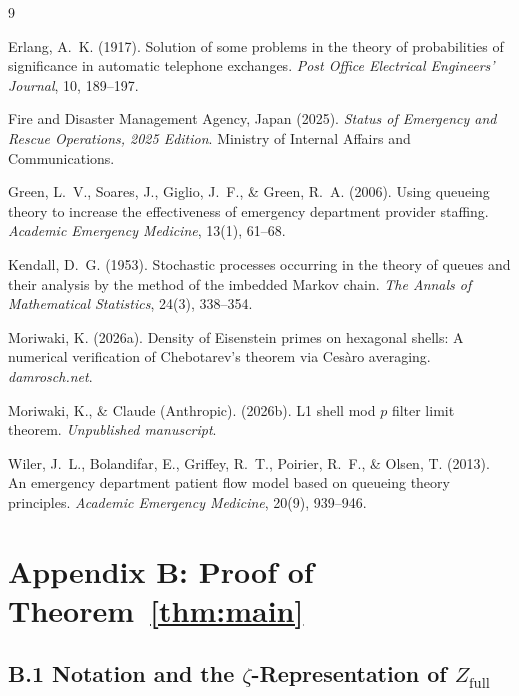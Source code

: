 \documentclass[12pt]{article}
\begin{document}

\begin{thebibliography}{9}

Erlang, A.~K. (1917).
Solution of some problems in the theory of probabilities of significance 
in automatic telephone exchanges.
\emph{Post Office Electrical Engineers' Journal}, 10, 189--197.

Fire and Disaster Management Agency, Japan (2025).
\emph{Status of Emergency and Rescue Operations, 2025 Edition}.
Ministry of Internal Affairs and Communications.

Green, L.~V., Soares, J., Giglio, J.~F., \& Green, R.~A. (2006).
Using queueing theory to increase the effectiveness of emergency 
department provider staffing.
\emph{Academic Emergency Medicine}, 13(1), 61--68.

Kendall, D.~G. (1953).
Stochastic processes occurring in the theory of queues and their 
analysis by the method of the imbedded Markov chain.
\emph{The Annals of Mathematical Statistics}, 24(3), 338--354.

Moriwaki, K. (2026a).
Density of Eisenstein primes on hexagonal shells: A numerical 
verification of Chebotarev's theorem via Ces\`{a}ro averaging.
\emph{damrosch.net}.

Moriwaki, K., \& Claude (Anthropic). (2026b).
L1 shell mod $p$ filter limit theorem.
\emph{Unpublished manuscript}.

Wiler, J.~L., Bolandifar, E., Griffey, R.~T., Poirier, R.~F., \& Olsen, T. (2013).
An emergency department patient flow model based on queueing theory principles.
\emph{Academic Emergency Medicine}, 20(9), 939--946.

\end{thebibliography}

\appendix
\section*{Appendix B: Proof of Theorem~\ref{thm:main}}

\subsection*{B.1 Notation and the $\zeta$-Representation of $Z_{\mathrm{full}}$}
\end{document}
